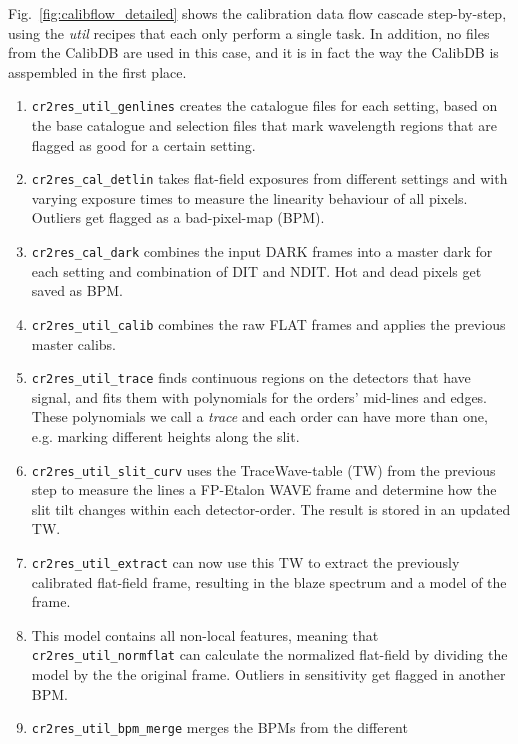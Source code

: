 Fig.~\ref{fig:calibflow_detailed} shows the calibration data flow cascade
step-by-step, using the \emph{util} recipes that each only perform a single
task. In addition, no files from the CalibDB are used in this case, and it is in
fact the way the CalibDB is asspembled in the first place.


\begin{enumerate}
    \item \texttt{cr2res\_util\_genlines} creates the catalogue files for each
          setting, based on the base catalogue and selection files that mark
          wavelength regions that are flagged as good for a certain setting.
    \item \texttt{cr2res\_cal\_detlin} takes flat-field exposures from different
          settings and with varying exposure times to measure the linearity
          behaviour of all pixels. Outliers get flagged as a bad-pixel-map
          (BPM).
    \item \texttt{cr2res\_cal\_dark} combines the input DARK frames into a
          master dark for each setting and combination of DIT and NDIT. Hot and
          dead pixels get saved as BPM.
    \item \texttt{cr2res\_util\_calib} combines the raw FLAT frames and applies
          the	       previous master calibs.
    \item \texttt{cr2res\_util\_trace} finds continuous regions on the detectors
          that have signal, and fits them with polynomials for the orders'
          mid-lines and edges. These polynomials we call a \emph{trace} and each
          order can have more than one, e.g. marking different heights along the
          slit.
    \item \texttt{cr2res\_util\_slit\_curv} uses the TraceWave-table (TW) from
          the previous step to measure the lines a FP-Etalon WAVE frame and
          determine how the slit tilt changes within each detector-order. The
          result is stored in an updated TW.
    \item \texttt{cr2res\_util\_extract} can now use this TW to extract the
          previously calibrated flat-field frame, resulting in the blaze
          spectrum and a model of the frame.
    \item This model contains all non-local features, meaning that
          \texttt{cr2res\_util\_normflat} can calculate the normalized
          flat-field by dividing the model by the the original frame. Outliers
          in sensitivity get flagged in another BPM.
    \item \texttt{cr2res\_util\_bpm\_merge} merges the BPMs from the different

\end{enumerate}
